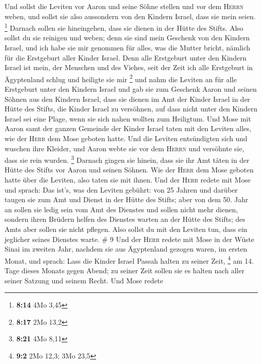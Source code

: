 Und sollst die Leviten vor Aaron und seine Söhne stellen und vor dem
\textsc{Herrn} weben,  und sollst sie also aussondern von
den Kindern Israel, dass sie mein seien. \footnote{\textbf{8:14} 4Mo
  3,45}  Darnach sollen sie hineingehen, dass sie dienen
in der Hütte des Stifts. Also sollst du sie reinigen und weben;
 denn sie sind mein Geschenk von den Kindern Israel, und
ich habe sie mir genommen für alles, was die Mutter bricht, nämlich für
die Erstgeburt aller Kinder Israel.  Denn alle Erstgeburt
unter den Kindern Israel ist mein, der Menschen und des Viehes, seit der
Zeit ich alle Erstgeburt in Ägyptenland schlug und heiligte sie mir
\footnote{\textbf{8:17} 2Mo 13,2}  und nahm die Leviten
an für alle Erstgeburt unter den Kindern Israel  und gab
sie zum Geschenk Aaron und seinen Söhnen aus den Kindern Israel, dass
sie dienen im Amt der Kinder Israel in der Hütte des Stifts, die Kinder
Israel zu versöhnen, auf dass nicht unter den Kindern Israel sei eine
Plage, wenn sie sich nahen wollten zum Heiligtum.  Und
Mose mit Aaron samt der ganzen Gemeinde der Kinder Israel taten mit den
Leviten alles, wie der \textsc{Herr} dem Mose geboten hatte.
 Und die Leviten entsündigten sich und wuschen ihre
Kleider, und Aaron webte sie vor dem \textsc{Herrn} und versöhnte sie,
dass sie rein wurden. \footnote{\textbf{8:21} 4Mo 8,11} 
Darnach gingen sie hinein, dass sie ihr Amt täten in der Hütte des
Stifts vor Aaron und seinen Söhnen. Wie der \textsc{Herr} dem Mose
geboten hatte über die Leviten, also taten sie mit ihnen.
 Und der \textsc{Herr} redete mit Mose und sprach:
 Das ist's, was den Leviten gebührt: von 25 Jahren und
darüber taugen sie zum Amt und Dienst in der Hütte des Stifts;
 aber von dem 50. Jahr an sollen sie ledig sein vom Amt
des Dienstes und sollen nicht mehr dienen,  sondern ihren
Brüdern helfen des Dienstes warten an der Hütte des Stifts; des Amts
aber sollen sie nicht pflegen. Also sollst du mit den Leviten tun, dass
ein jeglicher seines Dienstes warte. \# 9  Und der
\textsc{Herr} redete mit Mose in der Wüste Sinai im zweiten Jahr,
nachdem sie aus Ägyptenland gezogen waren, im ersten Monat, und sprach:
 Lass die Kinder Israel Passah halten zu seiner Zeit,
\footnote{\textbf{9:2} 2Mo 12,3; 3Mo 23,5}  am 14. Tage
dieses Monats gegen Abend; zu seiner Zeit sollen sie es halten nach
aller seiner Satzung und seinem Recht.  Und Mose redete
